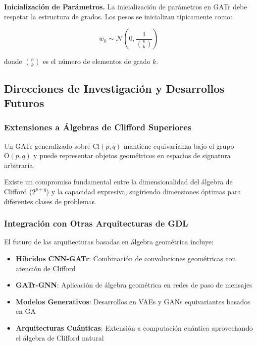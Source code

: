 \textbf{Inicialización de Parámetros.}\label{rem:inicializacion_parametros_ga} La inicialización de parámetros en GATr debe respetar la estructura de grados. Los pesos se inicializan típicamente como:

\begin{equation}
    w_k \sim \mathcal{N}\left(0, \frac{1}{\binom{n}{k}}\right)
\end{equation}

donde $\binom{n}{k}$ es el número de elementos de grado $k$.

\subsection{Direcciones de Investigación y Desarrollos Futuros}

\subsubsection{Extensiones a Álgebras de Clifford Superiores}

\begin{definition}\label{def:gatr_generalizado}
Un GATr generalizado sobre $\text{Cl}(p,q)$ mantiene equivarianza bajo el grupo $\text{O}(p,q)$ y puede representar objetos geométricos en espacios de signatura arbitraria.
\end{definition}

\begin{hypothesis}\label{hyp:escalabilidad_dimensional}
Existe un compromiso fundamental entre la dimensionalidad del álgebra de Clifford ($2^{p+q}$) y la capacidad expresiva, sugiriendo dimensiones óptimas para diferentes clases de problemas.
\end{hypothesis}

\subsubsection{Integración con Otras Arquitecturas de GDL}

El futuro de las arquitecturas basadas en álgebra geométrica incluye:

\begin{itemize}
    \item \textbf{Híbridos CNN-GATr}: Combinación de convoluciones geométricas con atención de Clifford
    \item \textbf{GATr-GNN}: Aplicación de álgebra geométrica en redes de paso de mensajes
    \item \textbf{Modelos Generativos}: Desarrollos en VAEs y GANs equivariantes basados en GA
    \item \textbf{Arquitecturas Cuánticas}: Extensión a computación cuántica aprovechando el álgebra de Clifford natural
\end{itemize}

